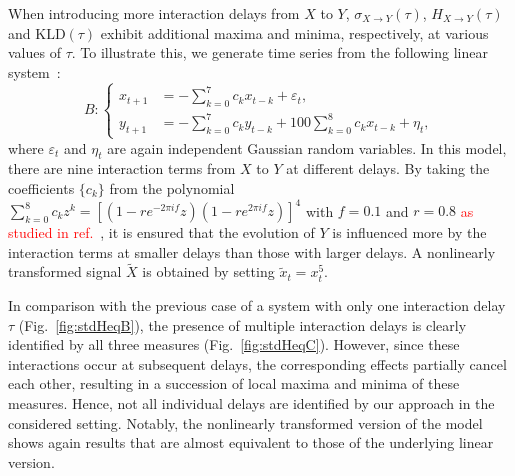 \documentclass[12pt,aip,cha,reprint,nofootinbib]{revtex4-1}
\begin{document}
When introducing more interaction delays from $X$ to $Y$, $\sigma_{X\to Y}(\tau)$, $H_{X \to Y}(\tau)$ and $\text{KLD}(\tau)$ exhibit additional maxima and minima, respectively, at various values of $\tau$. To illustrate this, we generate time series from the following linear system~\cite{LiPRE2018}:
\begin{equation} \label{eq:C}
B: \left \{ \begin{aligned}
x_{t+1} &= - \sum_{k=0}^{7} c_k x_{t-k} + \varepsilon_t, \\
y_{t+1} &= - \sum_{k=0}^{7} c_k y_{t-k} + 100 \sum_{k=0}^{8} c_k x_{t-k} + \eta_t,
\end{aligned}
\right.
\end{equation}
where $\varepsilon_t$ and $\eta_t$ are again independent Gaussian random variables. In this model, there are nine interaction terms from $X$ to $Y$ at different delays. By taking the coefficients $\{ c_k \}$ from the polynomial $\sum_{k=0}^{8} c_k z^{k} = [(1 - r e^{-2\pi i f}z)(1 - r e^{2\pi i f} z)]^{4}$ with $f = 0.1$ and $r = 0.8$ \textcolor{red}{as studied in ref.}~\cite{LiPRE2018}, it is ensured that the evolution of $Y$ is influenced more by the interaction terms at smaller delays than those with larger delays. A nonlinearly transformed signal $\tilde{X}$ is obtained by setting $\tilde{x}_{t} = x_{t}^{5}$. 

In comparison with the previous case of a system with only one interaction delay $\tau$ (Fig.~\ref{fig:stdHeqB}), the presence of multiple interaction delays is clearly identified by all three measures (Fig.~\ref{fig:stdHeqC}). However, since these interactions occur at subsequent delays, the corresponding effects partially cancel each other, resulting in a succession of local maxima and minima of these measures. Hence, not all individual delays are identified by our approach in the considered setting. Notably, the nonlinearly transformed version of the model shows again results that are almost equivalent to those of the underlying linear version.
\end{document}
